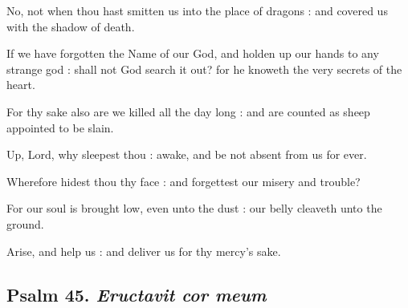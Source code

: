 No, not when thou hast smitten us into the place of dragons : and covered us with the shadow of death.\par
{}If we have forgotten the Name of our God, and holden up our hands to any strange god : shall not God search it out? for he knoweth the very secrets of the heart.\par
{}For thy sake also are we killed all the day long : and are counted as sheep appointed to be slain.\par
{}Up, Lord, why sleepest thou : awake, and be not absent from us for ever.\par
{}Wherefore hidest thou thy face : and forgettest our misery and trouble?\par
{}For our soul is brought low, even unto the dust : our belly cleaveth unto the ground.\par
{}Arise, and help us : and deliver us for thy mercy's sake.\par

\subsection{Psalm 45. \textit{Eructavit cor meum}}

